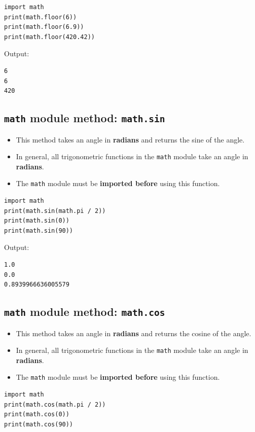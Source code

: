 \documentclass[11pt]{article}
\begin{document}
\begin{verbatim}
import math
print(math.floor(6))
print(math.floor(6.9))
print(math.floor(420.42))
\end{verbatim}

 \noindent Output:

\begin{verbatim}
6
6
420
\end{verbatim}

\subsection{\texttt{math} module method: \texttt{math.sin}}
\label{sec:org510eec6}
\begin{itemize}
\item This method takes an angle in \textbf{radians} and returns the sine of the angle.
\item In general, all trigonometric functions in the \texttt{math} module take an angle in \textbf{radians}.
\item The \texttt{math} module must be \textbf{imported before} using this function.
\end{itemize}

\begin{verbatim}
import math
print(math.sin(math.pi / 2))
print(math.sin(0))
print(math.sin(90))
\end{verbatim}

 \noindent Output:

\begin{verbatim}
1.0
0.0
0.8939966636005579
\end{verbatim}

\subsection{\texttt{math} module method: \texttt{math.cos}}
\label{sec:orga99bdf5}
\begin{itemize}
\item This method takes an angle in \textbf{radians} and returns the cosine of the angle.
\item In general, all trigonometric functions in the \texttt{math} module take an angle in \textbf{radians}.
\item The \texttt{math} module must be \textbf{imported before} using this function.
\end{itemize}

\begin{verbatim}
import math
print(math.cos(math.pi / 2))
print(math.cos(0))
print(math.cos(90))
\end{verbatim}
\end{document}
